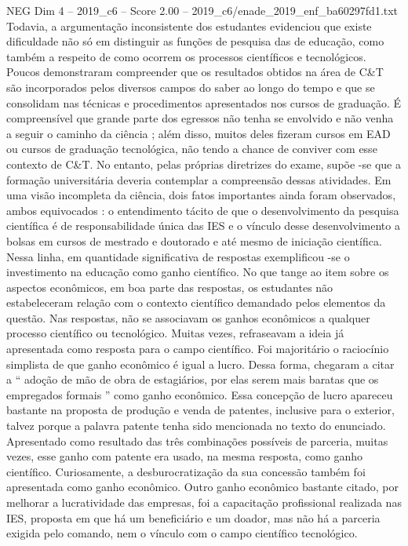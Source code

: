 \begin{textsample}{NEG Dim 4 – 2019\_c6 – Score 2.00 – 2019\_c6/enade\_2019\_enf\_ba60297fd1.txt}
Todavia, a argumentação inconsistente dos estudantes evidenciou que existe dificuldade não só em distinguir as funções de pesquisa das de educação, como também a respeito de como ocorrem os processos científicos e tecnológicos.
Poucos demonstraram compreender que os resultados obtidos na área de C\&T são incorporados pelos diversos campos do saber ao longo do tempo e que se consolidam nas técnicas e procedimentos apresentados nos cursos de graduação.
É compreensível que grande parte dos egressos não tenha se envolvido e não venha a seguir o caminho da ciência ; além disso, muitos deles fizeram cursos em EAD ou cursos de graduação tecnológica, não tendo a chance de conviver com esse contexto de C\&T.
No entanto, pelas próprias diretrizes do exame, supõe -se que a formação universitária deveria contemplar a compreensão dessas atividades.
Em uma visão incompleta da ciência, dois fatos importantes ainda foram observados, ambos equivocados : o entendimento tácito de que o desenvolvimento da pesquisa científica é de responsabilidade única das IES e o vínculo desse desenvolvimento a bolsas em cursos de mestrado e doutorado e até mesmo de iniciação científica.
Nessa linha, em quantidade significativa de respostas exemplificou -se o investimento na educação como ganho científico.
No que tange ao item sobre os aspectos econômicos, em boa parte das respostas, os estudantes não estabeleceram relação com o contexto científico demandado pelos elementos da questão.
Nas respostas, não se associavam os ganhos econômicos a qualquer processo científico ou tecnológico.
Muitas vezes, refraseavam a ideia já apresentada como resposta para o campo científico.
Foi majoritário o raciocínio simplista de que ganho econômico é igual a lucro.
Dessa forma, chegaram a citar a “ adoção de mão de obra de estagiários, por elas serem mais baratas que os empregados formais ” como ganho econômico.
Essa concepção de lucro apareceu bastante na proposta de produção e venda de patentes, inclusive para o exterior, talvez porque a palavra patente tenha sido mencionada no texto do enunciado.
Apresentado como resultado das três combinações possíveis de parceria, muitas vezes, esse ganho com patente era usado, na mesma resposta, como ganho científico.
Curiosamente, a desburocratização da sua concessão também foi apresentada como ganho econômico.
Outro ganho econômico bastante citado, por melhorar a lucratividade das empresas, foi a capacitação profissional realizada nas IES, proposta em que há um beneficiário e um doador, mas não há a parceria exigida pelo comando, nem o vínculo com o campo científico tecnológico.

\end{textsample}
